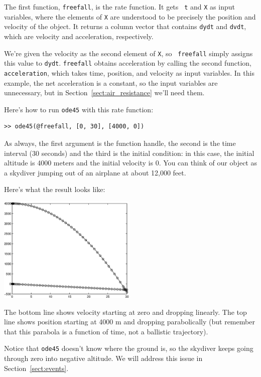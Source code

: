 \documentclass[
]{book}
\begin{document}
The first function, {\tt freefall}, is the rate function.  It gets {\tt
t} and {\tt X} as input variables, where the elements of {\tt X} are
understood to be precisely the position and velocity of the object.  It
returns a column vector that contains {\tt dydt} and {\tt dvdt}, which
are velocity and acceleration, respectively.

We're given the velocity as the second element of {\tt X}, so {\tt
freefall} simply assigns this value to {\tt dydt}.  {\tt freefall}
obtains acceleration by calling the second function, {\tt acceleration},
which takes time, position, and velocity as input variables.  In this
example, the net acceleration is a constant, so the input variables are
unnecessary, but in Section~\ref{sect:air_resistance} we'll need them.

Here's how to run {\tt ode45} with this rate function:

\begin{verbatim}
>> ode45(@freefall, [0, 30], [4000, 0])
\end{verbatim}

As always, the first argument is the function handle, the second
is the time interval (30 seconds) and the third is the initial
condition: in this case, the initial altitude is 4000 meters and
the initial velocity is 0. You can think of our object as
a skydiver jumping out of an airplane at about 12,000 feet.

Here's what the result looks like:

\beforefig \centerline{\includegraphics[height=2in]{figs/freefall.eps}}

The bottom line shows velocity starting at zero and dropping
linearly.  The top line shows position starting at 4000 m and
dropping parabolically (but remember that this parabola
is a function of time, not a ballistic trajectory).

Notice that {\tt ode45} doesn't know where the ground is, so the
skydiver keeps going through zero into negative altitude.  We will
address this issue in Section~\ref{sect:events}.
\end{document}
